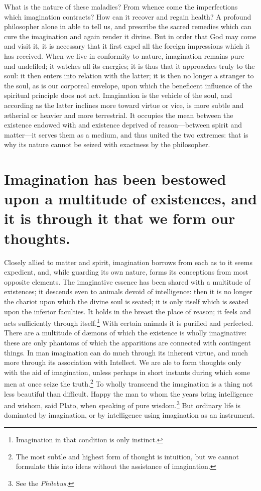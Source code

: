 \documentclass[12pt]{article}
\begin{document}
What is the nature of these maladies? From whence come the imperfections which
imagination contracts? How can it recover and regain health? A profound
philosopher alone in able to tell us, and prescribe the sacred remedies which
can cure the imagination and again render it divine. But in order that God may
come and visit it, it is necessary that it first expel all the foreign
impressions which it has received. When we live in conformity to nature,
imagination remains pure and undefiled; it watches all its energies; it is thus
that it approaches truly to the soul: it then enters into relation with the
latter; it is then no longer a stranger to the soul, as is our corporeal
envelope, upon which the beneficent influence of the spiritual principle does
not act. Imagination is the vehicle of the soul, and according as the latter
inclines more toward virtue or vice, is more subtle and {\ae}therial or heavier
and more terrestrial. It occupies the mean between the existence endowed with
and existence deprived of reason---between spirit and matter---it serves them
as a medium, and thus united the two extremes: that is why its nature cannot be
seized with exactness by the philosopher.


\section{Imagination has been bestowed upon a multitude of existences, and it
is through it that we form our thoughts.}

Closely allied to matter and spirit, imagination borrows from each as to it
seems expedient, and, while guarding its own nature, forms its conceptions from
most opposite elements. The imaginative essence has been shared with a
multitude of existences; it descends even to animals devoid of intelligence:
then it is no longer the chariot upon which the divine soul is seated; it is
only itself which is seated upon the inferior faculties. It holds in the breast
the place of reason; it feels and acts sufficiently through
itself.\footnote{Imagination in that condition is only instinct.} With certain
animals it is purified and perfected. There are a multitude of d{\ae}mons of
which the existence is wholly imaginative: these are only phantoms of which the
apparitions are connected with contingent things. In man imagination can do
much through its inherent virtue, and much more through its association with
Intellect. We are ale to form thoughts only with the aid of imagination, unless
perhaps in short instants during which some men at once seize the
truth.\footnote{The most subtle and highest form of thought is intuition, but
we cannot formulate this into ideas without the assistance of imagination.} To
wholly transcend the imagination is a thing not less beautiful than difficult.
Happy the man to whom the years bring intelligence and wishom, said Plato, when
speaking of pure wisdom.\footnote{See the \textit{Philebus.}} But ordinary life
is dominated by imagination, or by intelligence using imagination as an
instrument.
\end{document}
